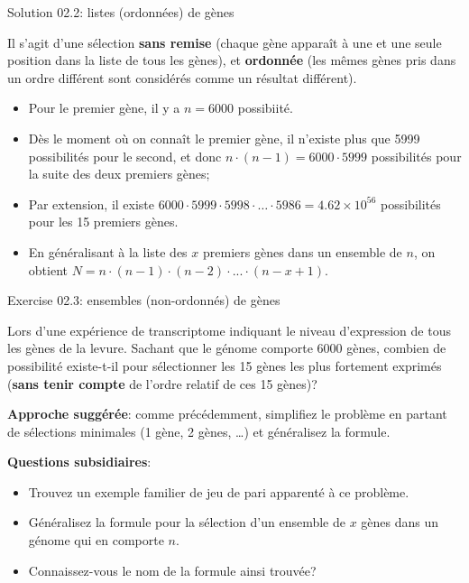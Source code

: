 \documentclass[ignorenonframetext,]{beamer}
\providecommand{\tightlist}{%
  \setlength{\itemsep}{0pt}\setlength{\parskip}{0pt}}
\begin{document}
\begin{frame}{Solution 02.2: listes (ordonnées) de gènes}
\protect\hypertarget{solution-02.2-listes-ordonnees-de-genes}{}

Il s'agit d'une sélection \textbf{sans remise} (chaque gène apparaît à
une et une seule position dans la liste de tous les gènes), et
\textbf{ordonnée} (les mêmes gènes pris dans un ordre différent sont
considérés comme un résultat différent).

\begin{itemize}
\tightlist
\item
  Pour le premier gène, il y a \(n=6000\) possibiité.
\item
  Dès le moment où on connaît le premier gène, il n'existe plus que 5999
  possibilités pour le second, et donc
  \(n \cdot (n-1) = 6000 \cdot 5999\) possibilités pour la suite des
  deux premiers gènes;
\item
  Par extension, il existe
  \(6000 \cdot 5999 \cdot 5998 \cdot \ldots \cdot 5986 = \ensuremath{4.62\times 10^{56}}\)
  possibilités pour les 15 premiers gènes.
\item
  En généralisant à la liste des \(x\) premiers gènes dans un ensemble
  de \(n\), on obtient
  \(N = n \cdot (n-1) \cdot (n-2) \cdot ... \cdot (n-x+1)\).
\end{itemize}

\end{frame}

\begin{frame}{Exercise 02.3: ensembles (non-ordonnés) de gènes}
\protect\hypertarget{exercise-02.3-ensembles-non-ordonnes-de-genes}{}

Lors d'une expérience de transcriptome indiquant le niveau d'expression
de tous les gènes de la levure. Sachant que le génome comporte 6000
gènes, combien de possibilité existe-t-il pour sélectionner les 15 gènes
les plus fortement exprimés (\textbf{sans tenir compte} de l'ordre
relatif de ces 15 gènes)?

\textbf{Approche suggérée}: comme précédemment, simplifiez le problème
en partant de sélections minimales (1 gène, 2 gènes, \ldots{}) et
généralisez la formule.

\textbf{Questions subsidiaires}:

\begin{itemize}
\tightlist
\item
  Trouvez un exemple familier de jeu de pari apparenté à ce problème.
\item
  Généralisez la formule pour la sélection d'un ensemble de \(x\) gènes
  dans un génome qui en comporte \(n\).
\item
  Connaissez-vous le nom de la formule ainsi trouvée?
\end{itemize}

\end{frame}
\end{document}
